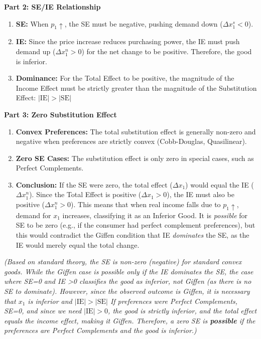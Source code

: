 \documentclass{article}
\begin{document}
\textbf{Part 2: SE/IE Relationship}
\begin{enumerate}
    \item \textbf{SE:} When $p_1 \uparrow$, the SE must be negative, pushing demand down ($\Delta x_1^s < 0$).
    \item \textbf{IE:} Since the price increase reduces purchasing power, the IE must push demand up ($\Delta x_1^n > 0$) for the net change to be positive. Therefore, the good is inferior.
    \item \textbf{Dominance:} For the Total Effect to be positive, the magnitude of the Income Effect must be strictly greater than the magnitude of the Substitution Effect: $|\text{IE}| > |\text{SE}|$
\end{enumerate}

\textbf{Part 3: Zero Substitution Effect}
\begin{enumerate}
    \item \textbf{Convex Preferences:} The total substitution effect is generally non-zero and negative when preferences are strictly convex (Cobb-Douglas, Quasilinear).
    \item \textbf{Zero SE Cases:} The substitution effect is only zero in special cases, such as Perfect Complements.
    \item \textbf{Conclusion:} If the SE were zero, the total effect ($\Delta x_1$) would equal the IE ($\Delta x_1^n$). Since the Total Effect is positive ($\Delta x_1 > 0$), the IE must also be positive ($\Delta x_1^n > 0$). This means that when real income falls due to $p_1 \uparrow$, demand for $x_1$ increases, classifying it as an Inferior Good. It is \textit{possible} for SE to be zero (e.g., if the consumer had perfect complement preferences), but this would contradict the Giffen condition that IE \textit{dominates} the SE, as the IE would merely equal the total change.
\end{enumerate}

\textit{(Based on standard theory, the SE is non-zero (negative) for standard convex goods. While the Giffen case is possible only if the IE dominates the SE, the case where SE=0 and IE >0 classifies the good as inferior, not Giffen (as there is no SE to dominate). However, since the observed outcome is Giffen, it is necessary that $x_1$ is inferior and $|\text{IE}| > |\text{SE}|$ If preferences were Perfect Complements, SE=0, and since we need $|\text{IE}| > 0$, the good is strictly inferior, and the total effect equals the income effect, making it Giffen. Therefore, a zero SE is \textit{\textbf{possible}} if the preferences are Perfect Complements and the good is inferior.)}
\end{document}
